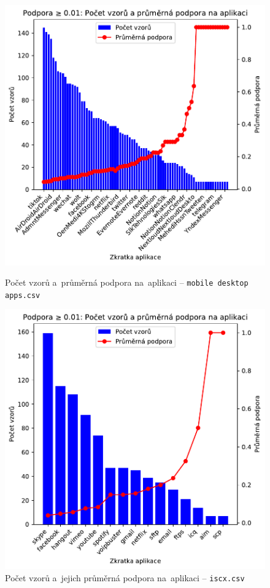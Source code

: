 \begin{figure}[H]
	\centering
	\begin{minipage}[t]{0.49\textwidth}
		\centering
		\includegraphics[width=\linewidth]{obrazky-figures/exps/patterns_support_0.01_mobile.pdf}
		\caption{Počet vzorů a~průměrná podpora na~aplikaci -- \texttt{mobile desktop apps.csv}}
		\label{fig:graph-num-vs-apps-mobile-001}
	\end{minipage}
	\hfill
	\begin{minipage}[t]{0.49\textwidth}
		\centering
		\includegraphics[width=\linewidth]{obrazky-figures/exps/patterns_support_0.01_iscx.pdf}
		\caption{Počet vzorů a~jejich průměrná podpora na~aplikaci -- \texttt{iscx.csv}}
		\label{fig:graph-num-vs-apps-iscx-001}
	\end{minipage}
\end{figure}


